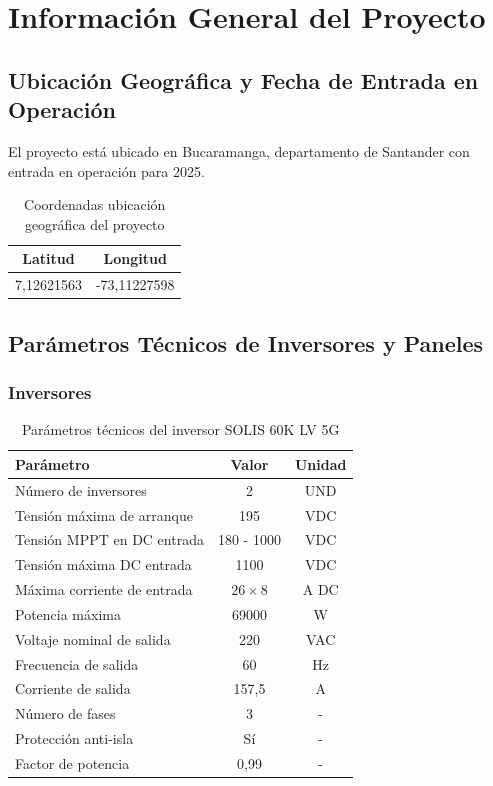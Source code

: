 \chapter{Información General del Proyecto}

\section{Ubicación Geográfica y Fecha de Entrada en Operación}

El proyecto está ubicado en Bucaramanga, departamento de Santander con entrada en operación para 2025.

\begin{table}[H]
    \centering
    \caption{Coordenadas ubicación geográfica del proyecto}
    \begin{tabular}{cc}
    \toprule
    \textbf{Latitud} & \textbf{Longitud} \\
    \midrule
    7,12621563 & -73,11227598 \\
    \bottomrule
    \end{tabular}
\end{table}

\section{Parámetros Técnicos de Inversores y Paneles}

\subsection{Inversores}

\begin{table}[H]
    \centering
    \caption{Parámetros técnicos del inversor SOLIS 60K LV 5G}
    \begin{tabular}{lcc}
    \toprule
    \textbf{Parámetro} & \textbf{Valor} & \textbf{Unidad} \\
    \midrule
    Número de inversores & 2 & UND \\
    Tensión máxima de arranque & 195 & VDC \\
    Tensión MPPT en DC entrada & 180 - 1000 & VDC \\
    Tensión máxima DC entrada & 1100 & VDC \\
    Máxima corriente de entrada & $26 \times 8$ & A DC \\
    Potencia máxima & 69000 & W \\
    Voltaje nominal de salida & 220 & VAC \\
    Frecuencia de salida & 60 & Hz \\
    Corriente de salida & 157,5 & A \\
    Número de fases & 3 & - \\
    Protección anti-isla & Sí & - \\
    Factor de potencia & 0,99 & - \\
    \bottomrule
    \end{tabular}
\end{table}

